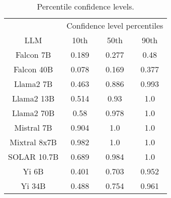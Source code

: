 \begin{table*}
\centering
\begin{tabular}{c|c|c|c}
& \multicolumn{3}{c}{Confidence level percentiles} \\ 
LLM & 10th & 50th & 90th\\ \hline
Falcon 7B & 0.189 & 0.277 & 0.48\\
Falcon 40B & 0.078 & 0.169 & 0.377\\
Llama2 7B & 0.463 & 0.886 & 0.993\\
Llama2 13B & 0.514 & 0.93 & 1.0\\
Llama2 70B & 0.58 & 0.978 & 1.0\\
Mistral 7B & 0.904 & 1.0 & 1.0\\
Mixtral 8x7B & 0.982 & 1.0 & 1.0\\
SOLAR 10.7B & 0.689 & 0.984 & 1.0\\
Yi 6B & 0.401 & 0.703 & 0.952\\
Yi 34B & 0.488 & 0.754 & 0.961\\
\hline
\end{tabular}
\caption{Percentile confidence levels.}
\label{tab:percentile_conf}
\end{table*}
